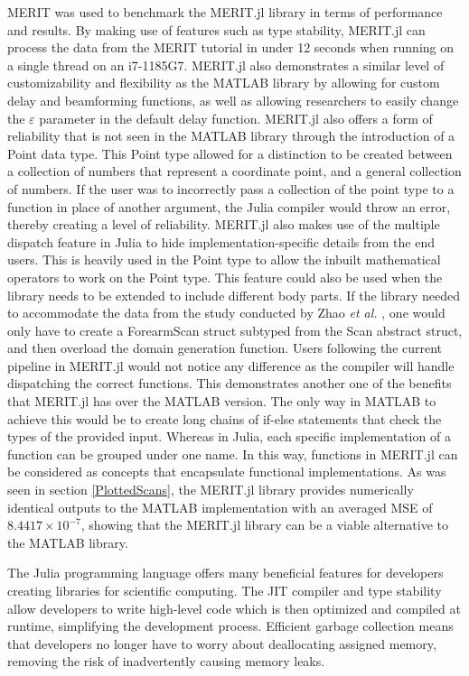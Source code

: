 MERIT was used to benchmark the MERIT.jl library in terms of performance and results. By making use of features such as
type stability, MERIT.jl can process the data from the MERIT tutorial in under 12 seconds when running on a single
thread on an i7-1185G7. MERIT.jl also demonstrates a similar level of customizability and flexibility as the MATLAB
library by allowing for custom delay and beamforming functions, as well as allowing researchers to easily change the
$\varepsilon$ parameter in the default delay function. MERIT.jl also offers a form of reliability that is not seen in
the MATLAB library through the introduction of a Point data type. This Point type allowed for a distinction to be
created between a collection of numbers that represent a coordinate point, and a general collection of numbers. If the
user was to incorrectly pass a collection of the point type to a function in place of another argument, the Julia
compiler would throw an error, thereby creating a level of reliability. MERIT.jl also makes use of the multiple dispatch
feature in Julia to hide implementation-specific details from the end users. This is heavily used in the Point
type to allow the inbuilt mathematical operators to work on the Point type. This feature could also be used when the
library needs to be extended to include different body parts. If the library needed to accommodate the data from the
study conducted by Zhao \textit{et al.} \cite{gilmoreMicrowaveImagingHuman2013}, one would only have to create a
ForearmScan struct subtyped from the Scan abstract struct, and then overload the domain generation function. Users
following the current pipeline in MERIT.jl would not notice any difference as the compiler will handle dispatching the
correct functions. This demonstrates another one of the benefits that MERIT.jl has over the MATLAB version. The only way
in MATLAB to achieve this would be to create long chains of if-else statements that check the types of the provided
input. Whereas in Julia, each specific implementation of a function can be grouped under one name. In this way,
functions in MERIT.jl can be considered as concepts that encapsulate functional implementations. As was seen in section
\ref{PlottedScans}, the MERIT.jl library provides numerically identical outputs to the MATLAB implementation with an
averaged MSE of $8.4417 \times 10^{-7}$, showing that the MERIT.jl library can be a viable alternative to the MATLAB
library.

The Julia programming language offers many beneficial features for developers creating libraries for scientific
computing. The JIT compiler and type stability allow developers to write high-level code which is then optimized and
compiled at runtime, simplifying the development process. Efficient garbage collection means that developers no longer
have to worry about deallocating assigned memory, removing the risk of inadvertently causing memory leaks.
